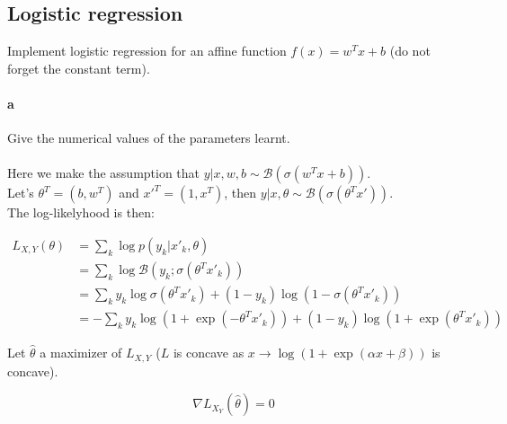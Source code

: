 \documentclass{article}
\begin{document}
\subsection{Logistic regression}

Implement logistic regression for an affine function $f(x)=w^Tx+b$ (do not forget the constant term).

\paragraph{a} Give the numerical values of the parameters learnt.\\
\vspace{10px}\\
Here we make the assumption that $y | x, w, b \sim \mathcal{B}(\sigma(w^Tx + b))$. \\
Let's $\theta^T = (b, w^T)$ and $x'^T = (1, x^T)$, then $y | x, \theta \sim  \mathcal{B}(\sigma(\theta^T x'))$.\\
The log-likelyhood is then:

\begin{equation*}
    \begin{aligned}
        L_{X, Y}(\theta) & = \sum_k \log p(y_k|x'_k, \theta)                                                      \\
                         & = \sum_k \log \mathcal{B}(y_k; \sigma(\theta^T x'_k))                                  \\
                         & = \sum_k y_k \log \sigma(\theta^T x'_k) + (1- y_k) \log (1 - \sigma(\theta^Tx'_k))     \\
                         & = - \sum_k y_k \log(1 + \exp(-\theta^T x'_k)) + (1 - y_k)\log(1 + \exp(\theta^T x'_k))
    \end{aligned}
\end{equation*}

Let $\widehat{\theta}$ a maximizer of $L_{X,Y}$ ($L$ is concave as $x \rightarrow \log(1 + \exp(\alpha x + \beta))$ is concave).

\begin{equation*}
    \nabla L_{X_Y}(\widehat\theta) = 0
\end{equation*}
\end{document}
